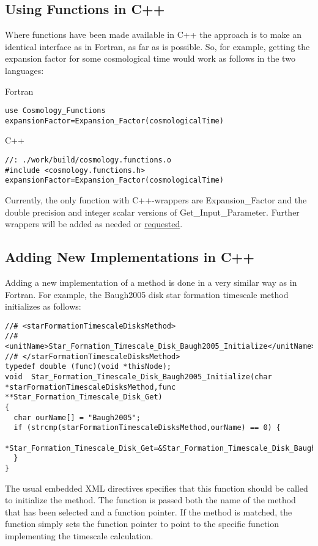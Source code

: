 \subsection{Using Functions in C++}

Where functions have been made available in C++ the approach is to make an identical interface as in Fortran, as far as is possible. So, for example, getting the expansion factor for some cosmological time would work as follows in the two languages:

\noindent Fortran
\begin{verbatim}
use Cosmology_Functions
expansionFactor=Expansion_Factor(cosmologicalTime)
\end{verbatim}

\noindent C++
\begin{verbatim}
//: ./work/build/cosmology.functions.o
#include <cosmology.functions.h>
expansionFactor=Expansion_Factor(cosmologicalTime)
\end{verbatim}

Currently, the only function with C++-wrappers are {\normalfont \ttfamily Expansion\_Factor} and the double precision and integer scalar versions of {\normalfont \ttfamily Get\_Input\_Parameter}. Further wrappers will be added as needed or \href{mailto:abenson@carnegiescience.edu}{requested}.

\subsection{Adding New Implementations in C++}

Adding a new implementation of a method is done in a very similar way as in Fortran. For example, the {\normalfont \ttfamily Baugh2005} disk star formation timescale method initializes as follows:

\begin{verbatim}
//# <starFormationTimescaleDisksMethod>
//#  <unitName>Star_Formation_Timescale_Disk_Baugh2005_Initialize</unitName>
//# </starFormationTimescaleDisksMethod>
typedef double (func)(void *thisNode);
void  Star_Formation_Timescale_Disk_Baugh2005_Initialize(char *starFormationTimescaleDisksMethod,func **Star_Formation_Timescale_Disk_Get)
{
  char ourName[] = "Baugh2005";
  if (strcmp(starFormationTimescaleDisksMethod,ourName) == 0) {
    *Star_Formation_Timescale_Disk_Get=&Star_Formation_Timescale_Disk_Baugh2005;
  }
}
\end{verbatim}
The usual embedded XML directives specifies that this function should be called to initialize the method. The function is passed both the name of the method that has been selected and a function pointer. If the method is matched, the function simply sets the function pointer to point to the specific function implementing the timescale calculation.

